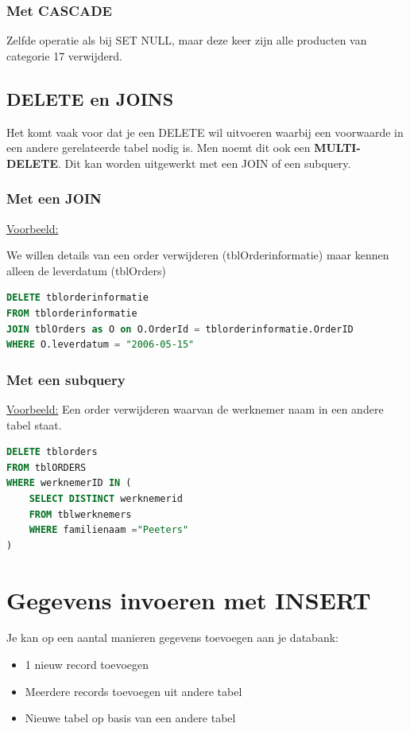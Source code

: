 \documentclass{article}
\newcommand{\bold}[1]{\textbf{#1}}
\begin{document}
\subsubsection{Met CASCADE}
Zelfde operatie als bij SET NULL, maar deze keer zijn alle producten van categorie 17 verwijderd.

\subsection{DELETE en JOINS}
Het komt vaak voor dat je een DELETE wil uitvoeren waarbij een voorwaarde in een andere gerelateerde tabel nodig is. 
Men noemt dit ook een \bold{MULTI-DELETE}. Dit kan worden uitgewerkt met een JOIN of een subquery.

\subsubsection{Met een JOIN}
\underline{Voorbeeld:} 

We willen details van een order verwijderen (tblOrderinformatie) maar kennen alleen de leverdatum (tblOrders)
\begin{lstlisting}[language=SQL]
DELETE tblorderinformatie
FROM tblorderinformatie
JOIN tblOrders as O on O.OrderId = tblorderinformatie.OrderID
WHERE O.leverdatum = "2006-05-15"
\end{lstlisting}


\subsubsection{Met een subquery}

\underline{Voorbeeld:} Een order verwijderen waarvan de werknemer naam in een andere tabel staat.
\begin{lstlisting}[language=SQL]
DELETE tblorders
FROM tblORDERS
WHERE werknemerID IN (
    SELECT DISTINCT werknemerid 
    FROM tblwerknemers
    WHERE familienaam ="Peeters"
)
\end{lstlisting}

\section{Gegevens invoeren met INSERT}
Je kan op een aantal manieren gegevens toevoegen aan je databank:

\begin{itemize}
    \item 1 nieuw record toevoegen
    \item Meerdere records toevoegen uit andere tabel
    \item Nieuwe tabel op basis van een andere tabel
\end{itemize}
\end{document}
